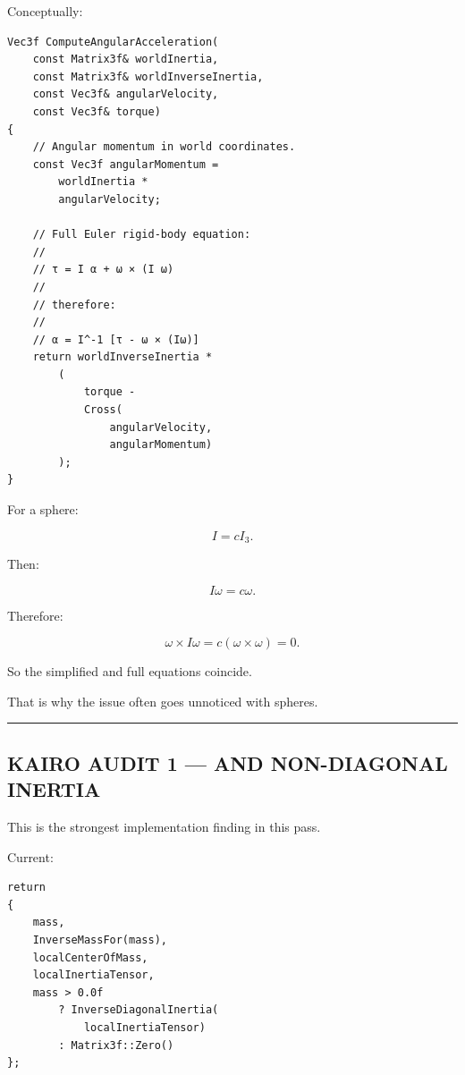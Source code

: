 Conceptually:

\begin{verbatim}
Vec3f ComputeAngularAcceleration(
    const Matrix3f& worldInertia,
    const Matrix3f& worldInverseInertia,
    const Vec3f& angularVelocity,
    const Vec3f& torque)
{
    // Angular momentum in world coordinates.
    const Vec3f angularMomentum =
        worldInertia *
        angularVelocity;

    // Full Euler rigid-body equation:
    //
    // τ = I α + ω × (I ω)
    //
    // therefore:
    //
    // α = I^-1 [τ - ω × (Iω)]
    return worldInverseInertia *
        (
            torque -
            Cross(
                angularVelocity,
                angularMomentum)
        );
}
\end{verbatim}

For a sphere:

\[
I=cI_3.
\]

Then:

\[
I\omega=c\omega.
\]

Therefore:

\[
\omega\times I\omega
=
c(\omega\times\omega)
=
0.
\]

So the simplified and full equations coincide.

That is why the issue often goes unnoticed with spheres.

\begin{center}\rule{0.5\linewidth}{0.5pt}\end{center}

\subsection{\texorpdfstring{KAIRO AUDIT 1 ---  AND NON-DIAGONAL INERTIA}{KAIRO AUDIT 1 ---  AND NON-DIAGONAL INERTIA}}\label{06-engine-ii-ch035-kairo-audit-1-makemassproperties-and-non-diagonal-inertia}

\hypertarget{06-engine-ii-ch035-kairo-audit-1-makemassproperties-and-non-diagonal-inertia}{}

This is the strongest implementation finding in this pass.

Current:

\begin{verbatim}
return
{
    mass,
    InverseMassFor(mass),
    localCenterOfMass,
    localInertiaTensor,
    mass > 0.0f
        ? InverseDiagonalInertia(
            localInertiaTensor)
        : Matrix3f::Zero()
};
\end{verbatim}


